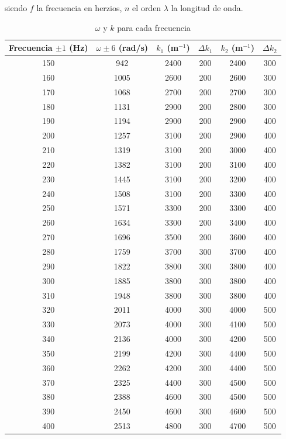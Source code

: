 \documentclass[a4paper,12pt,spanish]{article}
\begin{document}
	siendo $f$ la frecuencia en herzios, $n$ el orden $\lambda$ la longitud de onda.
	
	
	
	\begin{table}[H]
		\centering
		\begin{tabular}{|c|c|c|c|c|c|}
			\hline
			Frecuencia $\pm 1$ (Hz) & $\omega \pm 6$ (rad/s) & $k_1$ (m$^{-1}$) & $\Delta k_1$ & $k_2$ (m$^{-1}$) & $\Delta k_2$ \\ \hline\hline
			150 & 942 & 2400 & 200 & 2400 & 300 \\ \hline
			160 & 1005 & 2600 & 200 & 2600 & 300 \\ \hline
			170 & 1068 & 2700 & 200 & 2700 & 300 \\ \hline
			180 & 1131 & 2900 & 200 & 2800 & 300 \\ \hline
			190 & 1194 & 2900 & 200 & 2900 & 400 \\ \hline
			200 & 1257 & 3100 & 200 & 2900 & 400 \\ \hline
			210 & 1319 & 3100 & 200 & 3000 & 400 \\ \hline
			220 & 1382 & 3100 & 200 & 3100 & 400 \\ \hline
			230 & 1445 & 3100 & 200 & 3200 & 400 \\ \hline
			240 & 1508 & 3100 & 200 & 3300 & 400 \\ \hline
			250 & 1571 & 3300 & 200 & 3300 & 400 \\ \hline
			260 & 1634 & 3300 & 200 & 3400 & 400 \\ \hline
			270 & 1696 & 3500 & 200 & 3600 & 400 \\ \hline
			280 & 1759 & 3700 & 300 & 3700 & 400 \\ \hline
			290 & 1822 & 3800 & 300 & 3800 & 400 \\ \hline
			300 & 1885 & 3800 & 300 & 3800 & 400 \\ \hline
			310 & 1948 & 3800 & 300 & 3800 & 400 \\ \hline
			320 & 2011 & 4000 & 300 & 4000 & 500 \\ \hline
			330 & 2073 & 4000 & 300 & 4100 & 500 \\ \hline
			340 & 2136 & 4000 & 300 & 4200 & 500 \\ \hline
			350 & 2199 & 4200 & 300 & 4400 & 500 \\ \hline
			360 & 2262 & 4200 & 300 & 4400 & 500 \\ \hline
			370 & 2325 & 4400 & 300 & 4500 & 500 \\ \hline
			380 & 2388 & 4600 & 300 & 4500 & 500 \\ \hline
			390 & 2450 & 4600 & 300 & 4600 & 500 \\ \hline
			400 & 2513 & 4800 & 300 & 4700 & 500 \\ \hline
		\end{tabular}
	\caption{$\omega$ y $k$ para cada frecuencia}
	\end{table}
	
\end{document}
